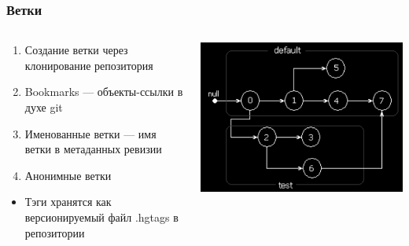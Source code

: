 \documentclass{../cscslides}
\begin{document}
    \begin{frame}
        \frametitle{Ветки}
        \begin{columns}
            \begin{column}{0.6\textwidth}
                \begin{enumerate}
                    \item Создание ветки через клонирование репозитория
                    \item Bookmarks --- объекты-ссылки в духе git
                    \item Именованные ветки --- имя ветки в метаданных ревизии
                    \item Анонимные ветки
                \end{enumerate}
                \begin{itemize}
                    \item Тэги хранятся как версионируемый файл .hgtags в репозитории
                \end{itemize}
            \end{column}
            \begin{column}{0.4\textwidth}
                \includegraphics[width=\textwidth]{mercurialBranchesBlack.png}
            \end{column}
        \end{columns}
    \end{frame}
\end{document}
